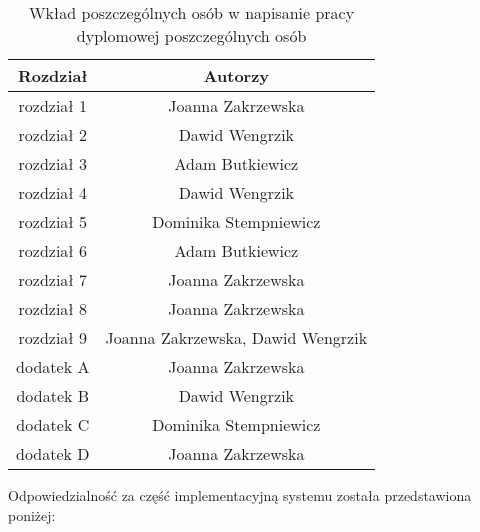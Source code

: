 \begin{table}[h]
\centering
\begin{tabular}{ | c | c | }
\hline
\textbf{Rozdział} & \textbf{Autorzy} \\ \hline
rozdział 1 & Joanna Zakrzewska \\ \hline
rozdział 2 & Dawid Wengrzik \\ \hline
rozdział 3 & Adam Butkiewicz \\ \hline
rozdział 4 & Dawid Wengrzik \\ \hline
rozdział 5 & Dominika Stempniewicz \\ \hline
rozdział 6 & Adam Butkiewicz \\ \hline
rozdział 7 & Joanna Zakrzewska \\ \hline
rozdział 8 & Joanna Zakrzewska \\ \hline
rozdział 9 & Joanna Zakrzewska, Dawid Wengrzik \\ \hline
dodatek A & Joanna Zakrzewska \\ \hline
dodatek B & Dawid Wengrzik \\ \hline
dodatek C & Dominika Stempniewicz \\ \hline
dodatek D & Joanna Zakrzewska \\ \hline
\end{tabular}
\caption{Wkład poszczególnych osób w napisanie pracy dyplomowej poszczególnych osób}\label{tab:roster}
\end{table}

Odpowiedzialność za część implementacyjną systemu została przedstawiona poniżej:

